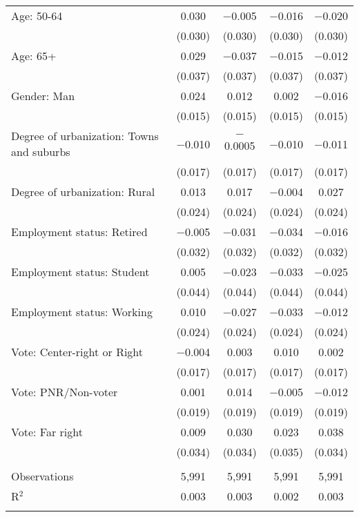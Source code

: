 \begin{tabular}{@{\extracolsep{5pt}}lcccc}
  Age: 50\mbox{-}64 & 0.030 & $-$0.005 & $-$0.016 & $-$0.020 \\ 
  & (0.030) & (0.030) & (0.030) & (0.030) \\ 
  Age: 65+ & 0.029 & $-$0.037 & $-$0.015 & $-$0.012 \\ 
  & (0.037) & (0.037) & (0.037) & (0.037) \\ 
  Gender: Man & 0.024 & 0.012 & 0.002 & $-$0.016 \\ 
  & (0.015) & (0.015) & (0.015) & (0.015) \\ 
  Degree of urbanization: Towns and suburbs & $-$0.010 & $-$0.0005 & $-$0.010 & $-$0.011 \\ 
  & (0.017) & (0.017) & (0.017) & (0.017) \\ 
  Degree of urbanization: Rural & 0.013 & 0.017 & $-$0.004 & 0.027 \\ 
  & (0.024) & (0.024) & (0.024) & (0.024) \\ 
  Employment status: Retired & $-$0.005 & $-$0.031 & $-$0.034 & $-$0.016 \\ 
  & (0.032) & (0.032) & (0.032) & (0.032) \\ 
  Employment status: Student & 0.005 & $-$0.023 & $-$0.033 & $-$0.025 \\ 
  & (0.044) & (0.044) & (0.044) & (0.044) \\ 
  Employment status: Working & 0.010 & $-$0.027 & $-$0.033 & $-$0.012 \\ 
  & (0.024) & (0.024) & (0.024) & (0.024) \\ 
  Vote: Center\mbox{-}right or Right & $-$0.004 & 0.003 & 0.010 & 0.002 \\ 
  & (0.017) & (0.017) & (0.017) & (0.017) \\ 
  Vote: PNR\slash Non\mbox{-}voter & 0.001 & 0.014 & $-$0.005 & $-$0.012 \\ 
  & (0.019) & (0.019) & (0.019) & (0.019) \\ 
  Vote: Far right & 0.009 & 0.030 & 0.023 & 0.038 \\ 
  & (0.034) & (0.034) & (0.035) & (0.034) \\ 
 \hline \\[-1.8ex] 

Observations & 5,991 & 5,991 & 5,991 & 5,991 \\ 
R$^{2}$ & 0.003 & 0.003 & 0.002 & 0.003 \\ 
\hline 
\hline \\[-1.8ex] 
\end{tabular} 